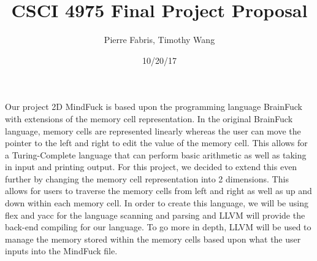 \documentclass[]{article}
\title{\textbf{CSCI 4975 Final Project Proposal}}
\author{Pierre Fabris, Timothy Wang}
\date{10/20/17}
\begin{document}
    \maketitle
Our project 2D MindFuck is based upon the programming language BrainFuck with extensions of the memory
cell representation. In the original BrainFuck language, memory cells are represented linearly whereas 
the user can move the pointer to the left and right to edit the value of the memory cell. This allows 
for a Turing-Complete language that can perform basic arithmetic as well as taking in input and printing
output. For this project, we decided to extend this even further by changing the memory cell representation
into 2 dimensions. This allows for users to traverse the memory cells from left and right as well as up and
down within each memory cell. In order to create this language, we will be using flex and yacc for the 
language scanning and parsing and LLVM will provide the back-end compiling for our language. To go more in depth,
LLVM will be used to manage the memory stored within the memory cells based upon what the user inputs into the 
MindFuck file. 
\end{document}
